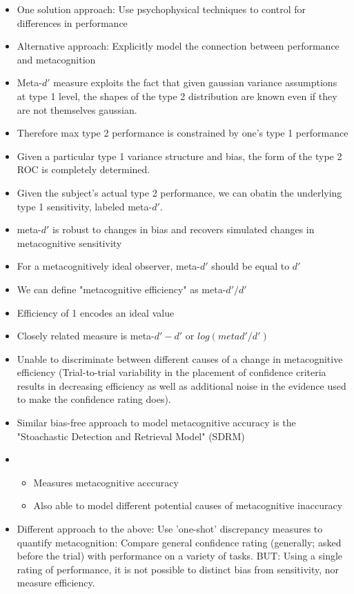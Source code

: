 \documentclass[../main/main.tex]{subfiles}
\begin{document}
\begin{itemize}
	\item One solution approach: Use psychophysical techniques to control for differences in performance
	\item Alternative approach: Explicitly model the connection between performance and metacognition
	\item Meta-$d'$ measure exploits the fact that given gaussian variance assumptions at type 1 level, the shapes of the type 2 distribution are known even if they are not themselves gaussian.
	\item Therefore max type 2 performance is constrained by one's type 1 performance
	\item Given a particular type 1 variance structure and bias, the form of the type 2 ROC is completely determined.
	\item Given the subject's actual type 2 performance, we can obatin the underlying type 1 sensitivity, labeled meta-$d'$.
	\item meta-$d'$ is robust to changes in bias and recovers simulated changes in metacognitive sensitivity
	\item For a metacognitively ideal observer, meta-$d'$ should be equal to $d'$
	\item We can define "metacognitive efficiency" as meta-$d'/d'$
	\item Efficiency of 1 encodes an ideal value
	\item Closely related measure is meta-$d' - d'$ or $log(meta d'/d')$
	\item Unable to discriminate between different causes of a change in metacognitive efficiency (Trial-to-trial variability in the placement of confidence criteria results in decreasing efficiency as well as additional noise in the evidence used to make the confidence rating does).
	\item Similar bias-free approach to model metacognitive accuracy is the "Stoachastic Detection and Retrieval Model" (SDRM)
	\item[] \begin{itemize}
				\item Measures metacognitive acccuracy
				\item Also able to model different potential causes of metacognitive inaccuracy
			\end{itemize}
	\item Different approach to the above: Use 'one-shot' discrepancy measures to quantify metacognition: Compare general confidence rating (generally; asked before the trial) with performance on a variety of tasks. BUT: Using a single rating of performance, it is not possible to distinct bias from sensitivity, nor measure efficiency.

\end{itemize}
\end{document}
